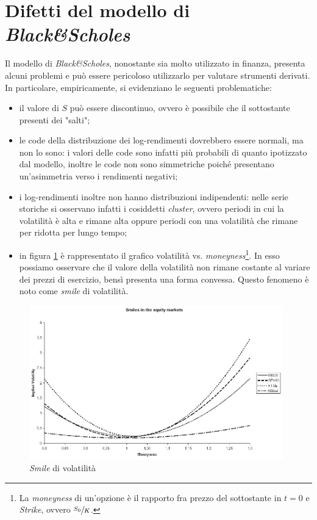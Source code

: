 \documentclass[a4paper,10pt]{report}
\theoremstyle{plain}
\theoremstyle{definition}
\theoremstyle{remark}
\begin{document}
\section{Difetti del modello di \emph{Black\&Scholes}}
Il modello di \emph{Black\&Scholes}, nonostante sia molto utilizzato in finanza, presenta alcuni problemi e pu\`o essere pericoloso utilizzarlo per valutare strumenti derivati. In particolare, empiricamente, si evidenziano le seguenti problematiche:
\begin{itemize}
\item il valore di $S$ pu\`o essere discontinuo, ovvero \`e possibile che il sottostante presenti dei "salti";
\item le code della distribuzione dei log-rendimenti dovrebbero essere normali, ma non lo sono: i valori delle code sono infatti pi\`u probabili di quanto ipotizzato dal modello, inoltre le code non sono simmetriche poich\'e presentano un'asimmetria verso i rendimenti negativi;
\item i log-rendimenti inoltre non hanno distribuzioni indipendenti: nelle serie storiche si osservano infatti i cosiddetti \emph{cluster}, ovvero periodi in cui la volatilit\`a \`e alta e rimane alta oppure periodi con una volatilit\`a che rimane per ridotta per lungo tempo;
\item in figura \ref{smile} \`e rappresentato il grafico volatilit\`a vs. \emph{moneyness}\footnote{La \emph{moneyness} di un'opzione \`e il rapporto fra prezzo del sottostante in $t=0$ e \emph{Strike}, ovvero $\sfrac{S_0}{K}$.}. In esso possiamo osservare che il valore della volatilit\`a non rimane costante al variare dei prezzi di esercizio, bens\`i presenta una forma convessa. Questo fenomeno \`e noto come \emph{smile} di volatilit\`a.
\end{itemize}
\begin{figure}[htbp!]
\begin{center}
\includegraphics[width=11cm]{img/smile.jpg}
\caption{\emph{Smile} di volatilit\`a}
\label{smile}
\end{center}
\end{figure}
\end{document}
